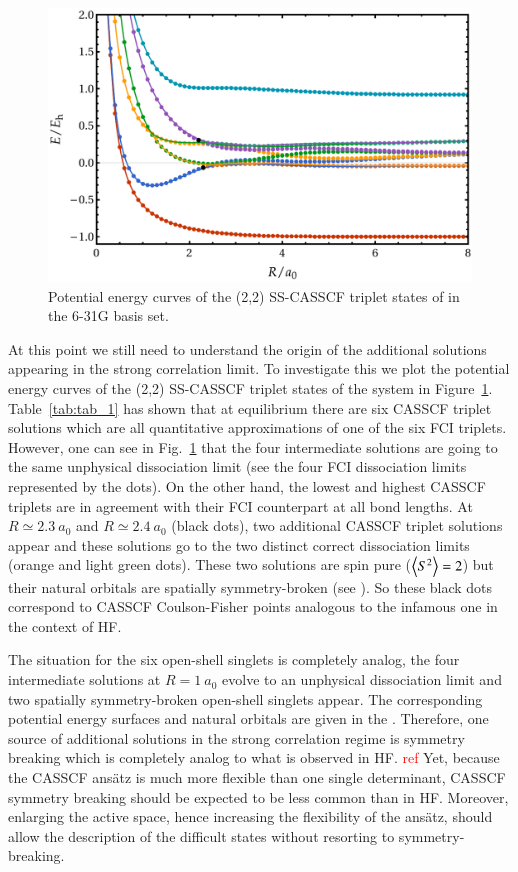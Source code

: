 \documentclass[aps,prb,reprint,showkeys,superscriptaddress]{revtex4-1}
\newcommand{\todo}[1]{\textcolor{red}{#1}}
\begin{document}
\begin{figure}
  \centering
  \includegraphics[width=0.9\linewidth]{Figures/fig_6.pdf}
  \caption{Potential energy curves of the (2,2) SS-CASSCF triplet states of  in the 6-31G basis set. \label{fig:fig_8}}
\end{figure}

At this point we still need to understand the origin of the additional solutions appearing in the strong correlation limit.
To investigate this we plot the potential energy curves of the (2,2) SS-CASSCF triplet states of the system in Figure~\ref{fig:fig_8}.
Table~\ref{tab:tab_1} has shown that at equilibrium there are six CASSCF triplet solutions which are all quantitative approximations of one of the six FCI triplets.
However, one can see in Fig.~\ref{fig:fig_8} that the four intermediate solutions are going to the same unphysical dissociation limit (see the four FCI dissociation limits represented by the dots).
On the other hand, the lowest and highest CASSCF triplets are in agreement with their FCI counterpart at all bond lengths.
At $R\simeq 2.3~a_0$ and $R\simeq 2.4~a_0$ (black dots), two additional CASSCF triplet solutions appear and these solutions go to the two distinct correct dissociation limits (orange and light green dots).
These two solutions are spin pure ($\expval{S^2}=2$) but their natural orbitals are spatially symmetry-broken (see \SupInf).
So these black dots correspond to CASSCF Coulson-Fisher points analogous to the infamous one in the context of HF.

The situation for the six open-shell singlets is completely analog, \ie the four intermediate solutions at $R=1~a_0$ evolve to an unphysical dissociation limit and two spatially symmetry-broken open-shell singlets appear.
The corresponding potential energy surfaces and natural orbitals are given in the \SupInf.
Therefore, one source of additional solutions in the strong correlation regime is symmetry breaking which is completely analog to what is observed in HF. \todo{ref}
Yet, because the CASSCF ans\"atz is much more flexible than one single determinant, CASSCF symmetry breaking should be expected to be less common than in HF.
Moreover, enlarging the active space, hence increasing the flexibility of the ans\"atz, should allow the description of the difficult states without resorting to symmetry-breaking.
\end{document}
